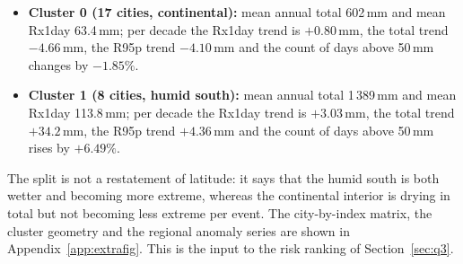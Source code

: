 \begin{itemize}[leftmargin=1.4em,itemsep=1pt]
\item \textbf{Cluster 0 (17 cities, continental):} mean annual total 602\,mm and mean Rx1day 63.4\,mm; per decade the Rx1day trend is $+0.80$\,mm, the total trend $-4.66$\,mm, the R95p trend $-4.10$\,mm and the count of days above 50\,mm changes by $-1.85\%$.
\item \textbf{Cluster 1 (8 cities, humid south):} mean annual total 1\,389\,mm and mean Rx1day 113.8\,mm; per decade the Rx1day trend is $+3.03$\,mm, the total trend $+34.2$\,mm, the R95p trend $+4.36$\,mm and the count of days above 50\,mm rises by $+6.49\%$.
\end{itemize}

The split is not a restatement of latitude: it says that the humid south is both wetter and becoming more extreme, whereas the continental interior is drying in total but not becoming less extreme per event. The city-by-index matrix, the cluster geometry and the regional anomaly series are shown in Appendix~\ref{app:extrafig}. This is the input to the risk ranking of Section~\ref{sec:q3}.